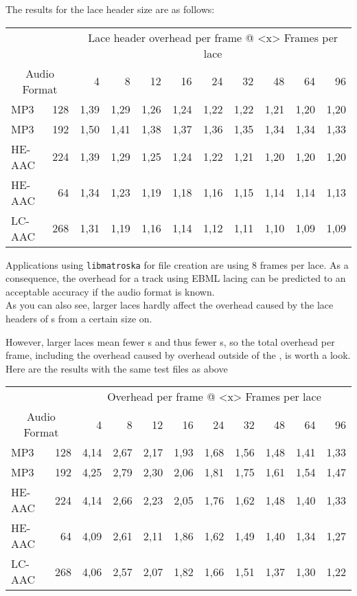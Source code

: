 \documentclass[12pt]{article}
\begin{document}
The results for the lace header size are as follows:

\begin{tabular}{@{}l@{ @ }r@{ kbps\hspace*{3mm}}|rrrrrrrrr@{}}
\multicolumn{2}{c|}{ } & \multicolumn{9}{c}{Lace header overhead per frame @ <x> Frames per lace} \\
\multicolumn{2}{c|}{Audio Format} & 4 & 8 & 12 & 16 & 24 & 32 & 48 & 64 & 96 \\
\hline MP3 & 128  & 1,39 & 1,29 & 1,26 & 1,24 & 1,22 & 1,22 & 1,21 & 1,20 &1,20 \\
MP3 & 192 & 1,50 & 1,41 & 1,38 & 1,37 & 1,36 & 1,35 & 1,34 & 1,34 & 1,33 \\
HE-AAC & 224 & 1,39 & 1,29 & 1,25 & 1,24 & 1,22 & 1,21 & 1,20 & 1,20 & 1,20 \\
HE-AAC & 64 & 1,34 & 1,23 & 1,19 & 1,18 & 1,16 & 1,15 & 1,14 & 1,14 & 1,13 \\
LC-AAC & 268 & 1,31 & 1,19 & 1,16 & 1,14 & 1,12 & 1,11 & 1,10 & 1,09 & 1,09
\end{tabular}

Applications using \texttt{libmatroska} for \Matroska file creation are using 8 frames per lace. As a consequence, the overhead for a track using EBML lacing can be predicted to an acceptable accuracy if the audio format
is known.\\As you can also see, larger laces hardly affect the overhead caused by the lace headers of s from a certain size on.

However, larger laces mean fewer s and thus fewer s, so the total overhead per frame, including the overhead caused by overhead outside of the , is worth a look. Here are the results with
the same test files as above

\begin{tabular}{@{}l@{ @ }r@{ kbps\hspace*{3mm}}|rrrrrrrrr@{}}
\multicolumn{2}{c|}{ } & \multicolumn{9}{c}{Overhead per frame @ <x> Frames per lace} \\
\multicolumn{2}{c|}{Audio Format} & 4 & 8 & 12 & 16 & 24 & 32 & 48 & 64 & 96 \\
\hline
MP3 & 128 & 4,14 & 2,67 & 2,17 & 1,93 & 1,68 & 1,56 & 1,48 & 1,41 & 1,33 \\
MP3 & 192 & 4,25 & 2,79 & 2,30 & 2,06 & 1,81 & 1,75 & 1,61 & 1,54 & 1,47\\
HE-AAC & 224 & 4,14 & 2,66 & 2,23 & 2,05 & 1,76 & 1,62 & 1,48 & 1,40 & 1,33\\
HE-AAC & 64 & 4,09 & 2,61 & 2,11 & 1,86 & 1,62 & 1,49 & 1,40 & 1,34 & 1,27\\
LC-AAC & 268 & 4,06 & 2,57 & 2,07 & 1,82 & 1,66 & 1,51 & 1,37 & 1,30 & 1,22
\end{tabular}
\end{document}
